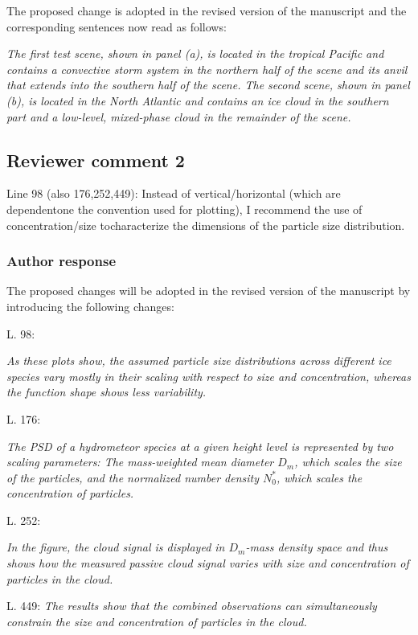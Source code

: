 \documentclass[11pt]{scrartcl}
\begin{document}
The proposed change is adopted in the revised version of the manuscript and the corresponding
sentences now read as follows:

\textit{
The first test scene, shown in panel (a), is located in the
tropical Pacific and contains a convective storm system in the northern half of
the scene and its anvil that extends into the southern half of the scene. The
second scene, shown in panel (b), is located in the North Atlantic and contains
an ice cloud in the southern part and a low-level, mixed-phase cloud in the
remainder of the scene.
}



\subsection*{Reviewer comment 2}
Line  98  (also  176,252,449):  Instead  of  vertical/horizontal  (which  are  dependentone the convention used for plotting), I recommend the use of concentration/size tocharacterize the dimensions of the particle size distribution.

\subsubsection*{Author response}

The proposed changes will be adopted in the revised version of the manuscript
by introducing the following changes:

L. 98:

\textit{
As these plots show, the
assumed particle size distributions across different ice species vary mostly in
their scaling with respect to size and concentration, whereas the function shape shows less
variability.}

L. 176:

\textit{ The PSD of a hydrometeor species at a given height level is represented
  by two scaling parameters: The mass-weighted mean diameter $D_m$, which scales
  the size of the particles, and the normalized number density $N_0^*$, which
  scales the concentration of particles.}

L. 252:

\textit{ In the figure, the cloud signal is displayed in $D_m$-mass density
  space and thus shows how the measured passive cloud signal varies with size
  and concentration of particles in the cloud. }


L. 449:
\textit{The results show that the combined observations can simultaneously
  constrain the size and concentration of particles in the cloud.}
\end{document}
